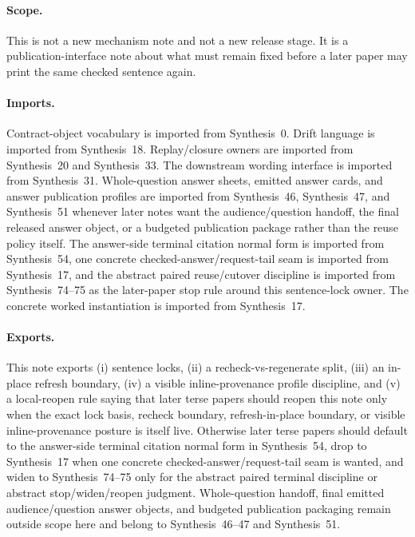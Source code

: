 \documentclass[11pt]{article}
\begin{document}
\paragraph{Scope.}
This is not a new mechanism note and not a new release stage.
It is a publication-interface note about what must remain fixed before a later paper may print the same checked sentence again.

\paragraph{Imports.}
Contract-object vocabulary is imported from Synthesis~0.\cite{series:contractobjects}
Drift language is imported from Synthesis~18.\cite{series:planstateequiv}
Replay/closure owners are imported from Synthesis~20 and Synthesis~33.\cite{series:auditorreplay,series:releaseclosure}
The downstream wording interface is imported from Synthesis~31.\cite{series:downstreamnormalforms}
Whole-question answer sheets, emitted answer cards, and answer publication profiles are imported from Synthesis~46, Synthesis~47, and Synthesis~51 whenever later notes want the audience/question handoff, the final released answer object, or a budgeted publication package rather than the reuse policy itself.\cite{series:challengeanswersheets,series:challengeanswercards,series:challengeanswerpublicationprofiles}
The answer-side terminal citation normal form is imported from Synthesis~54, one concrete checked-answer/request-tail seam is imported from Synthesis~17, and the abstract paired reuse/cutover discipline is imported from Synthesis~74--75 as the later-paper stop rule around this sentence-lock owner.\cite{series:challengeanswerreviewmenus,series:workedexample,series:pairedterminalcitationdiscipline,series:pairedterminalcutoverrules}
The concrete worked instantiation is imported from Synthesis~17.\cite{series:workedexample}

\paragraph{Exports.}
This note exports (i) sentence locks, (ii) a recheck-vs-regenerate split, (iii) an in-place refresh boundary, (iv) a visible inline-provenance profile discipline, and (v) a local-reopen rule saying that later terse papers should reopen this note only when the exact lock basis, recheck boundary, refresh-in-place boundary, or visible inline-provenance posture is itself live. Otherwise later terse papers should default to the answer-side terminal citation normal form in Synthesis~54, drop to Synthesis~17 when one concrete checked-answer/request-tail seam is wanted, and widen to Synthesis~74--75 only for the abstract paired terminal discipline or abstract stop/widen/reopen judgment. Whole-question handoff, final emitted audience/question answer objects, and budgeted publication packaging remain outside scope here and belong to Synthesis~46--47 and Synthesis~51.\cite{series:challengeanswersheets,series:challengeanswercards,series:challengeanswerpublicationprofiles,series:challengeanswerreviewmenus,series:workedexample,series:pairedterminalcitationdiscipline,series:pairedterminalcutoverrules}
\end{document}
